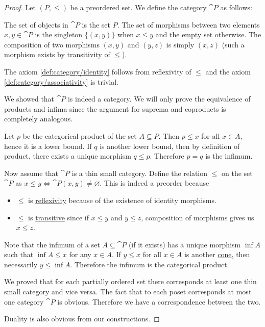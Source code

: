 \begin{proof}
  \SufficiencySubProof Let \( (P, \leq) \) be a preordered set. We define the category \( \cat{P} \) as follows:
  \begin{refenum}
     The set of objects in \( \cat{P} \) is the set \( P \).
     The set of morphisms between two elements \( x, y \in \cat{P} \) is the singleton \( \{ (x, y) \} \) when \( x \leq y \) and the empty set otherwise.
     The composition of two morphisms \( (x, y) \) and \( (y, z) \) is simply \( (x, z) \) (such a morphism exists by transitivity of \( \leq \)).

    The axiom \ref{def:category/identity} follows from reflexivity of \( \leq \) and the axiom \ref{def:category/associativity} is trivial.
  \end{refenum}

  We showed that \( \cat{P} \) is indeed a category. We will only prove the equivalence of products and infima since the argument for suprema and coproducts is completely analogous.

  Let \( p \) be the categorical product of the set \( A \subseteq P \). Then \( p \leq x \) for all \( x \in A \), hence it is a lower bound. If \( q \) is another lower bound, then by definition of product, there exists a unique morphism \( q \leq p \). Therefore \( p = q \) is the infimum.

  \NecessitySubProof Now assume that \( \cat{P} \) is a thin small category. Define the relation \( \leq \) on the set \( \cat{P} \) as \( x \leq y \iff \cat{P}(x, y) \neq \varnothing \). This is indeed a preorder because
  \begin{itemize}
    \item \( \leq \) is \hyperref[def:binary_relation/reflexive]{reflexivity} because of the existence of identity morphisms.
    \item \( \leq \) is \hyperref[def:binary_relation/transitive]{transitive} since if \( x \leq y \) and \( y \leq z \), composition of morphisms gives us \( x \leq z \).
  \end{itemize}

  Note that the infimum of a set \( A \subseteq \cat{P} \) (if it exists) has a unique morphism \( \inf A \) such that \( \inf A \leq x \) for any \( x \in A \). If \( y \leq x \) for all \( x \in A \) is another \hyperref[def:categorical_cone]{cone}, then necessarily \( y \leq \inf A \). Therefore the infimum is the categorical product.

  We proved that for each partially ordered set there corresponds at least one thin small category and vice versa. The fact that to each poset corresponds at most one category \( \cat{P} \) is obvious. Therefore we have a correspondence between the two.

  Duality is also obvious from our constructions.
\end{proof}

